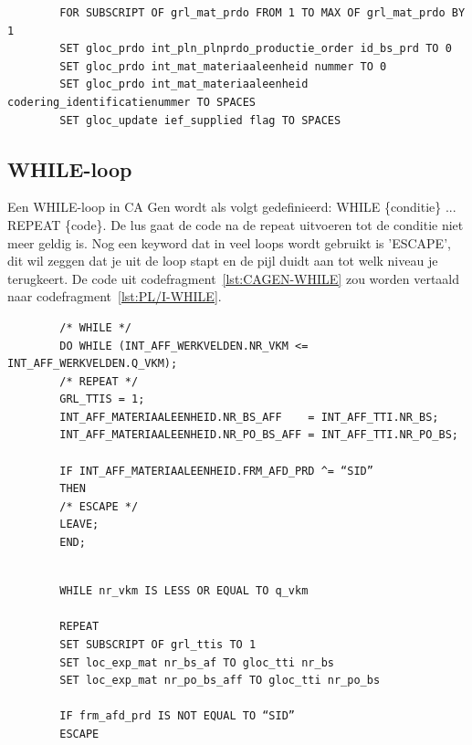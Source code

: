 \begin{listing}[h]
    \caption[Voorbeeld CA Gen-code: FOR-loop]{CA Gen-code FOR-loop en variabelen}
    \label{lst:CA_GEN-forloop}
    \begin{verbatim}
        FOR SUBSCRIPT OF grl_mat_prdo FROM 1 TO MAX OF grl_mat_prdo BY 1
        SET gloc_prdo int_pln_plnprdo_productie_order id_bs_prd TO 0
        SET gloc_prdo int_mat_materiaaleenheid nummer TO 0
        SET gloc_prdo int_mat_materiaaleenheid codering_identificatienummer TO SPACES
        SET gloc_update ief_supplied flag TO SPACES
    \end{verbatim}
\end{listing}

\subsection{WHILE-loop}
Een WHILE-loop in CA Gen wordt als volgt gedefinieerd: WHILE \{conditie\} ... REPEAT \{code\}. De lus gaat de code na de repeat uitvoeren tot de conditie niet meer geldig is. Nog een keyword dat in veel loops wordt gebruikt is 'ESCAPE', dit wil zeggen dat je uit de loop stapt en de pijl duidt aan tot welk niveau je terugkeert. De code uit codefragment~\ref{lst:CAGEN-WHILE} zou worden vertaald naar codefragment~\ref{lst:PL/I-WHILE}.

\begin{listing}[h]
    \caption[PL/I voorbeeld van WHILE loop]{PL/I voorbeeld van WHILE loop}
    \label{lst:PL/I-WHILE}
    \begin{verbatim}
        /* WHILE */
        DO WHILE (INT_AFF_WERKVELDEN.NR_VKM <= INT_AFF_WERKVELDEN.Q_VKM);
        /* REPEAT */
        GRL_TTIS = 1;
        INT_AFF_MATERIAALEENHEID.NR_BS_AFF    = INT_AFF_TTI.NR_BS;
        INT_AFF_MATERIAALEENHEID.NR_PO_BS_AFF = INT_AFF_TTI.NR_PO_BS;
        
        IF INT_AFF_MATERIAALEENHEID.FRM_AFD_PRD ^= “SID”
        THEN
        /* ESCAPE */
        LEAVE;
        END;
    \end{verbatim}
\end{listing}

\begin{listing}[h]
    \caption[Voorbeeld CA Gen-code: WHILE-loop met ESCAPE]{CA Gen-code van een WHILE-loop en ESCAPE}
    \label{lst:CAGEN-WHILE}
    \begin{verbatim}
        
        WHILE nr_vkm IS LESS OR EQUAL TO q_vkm
        
        REPEAT
        SET SUBSCRIPT OF grl_ttis TO 1
        SET loc_exp_mat nr_bs_af TO gloc_tti nr_bs
        SET loc_exp_mat nr_po_bs_aff TO gloc_tti nr_po_bs
        
        IF frm_afd_prd IS NOT EQUAL TO “SID”
        ESCAPE
        
    \end{verbatim}
\end{listing}

